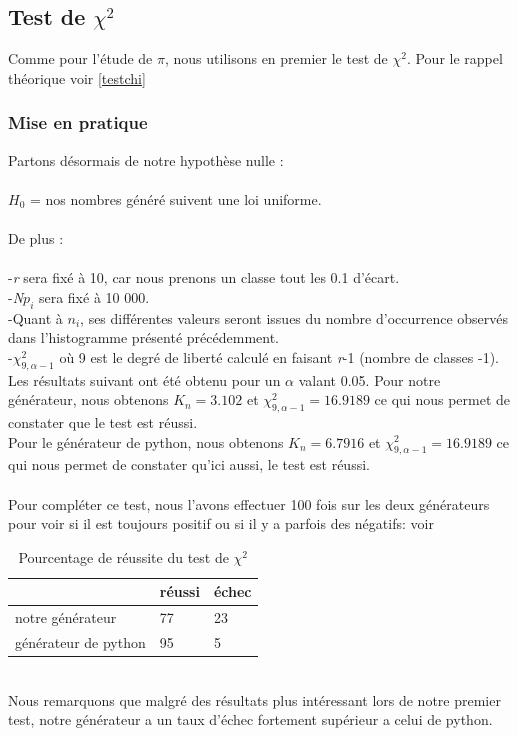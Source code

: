 \documentclass[french]{article}
\begin{document}
\subsection{Test de $\chi^{2}$}
Comme pour l'étude de $\pi$, nous utilisons en premier le test de $\chi^{2}$. Pour le rappel théorique voir \ref{testchi}
\subsubsection{Mise en pratique}
Partons désormais de notre hypothèse nulle :
\\
\\
       $H_{0}$ = {nos nombres généré suivent une loi uniforme}.
\\
\\
De plus : 
\\
\\
     -\textit{r} sera fixé à 10, car nous prenons un classe tout les 0.1 d'écart.
     \\
     -\textit{N$p_{i}$} sera fixé à 10 000.
     \\ 
     -Quant à \textit{$n_{i}$}, ses différentes valeurs seront issues du nombre d'occurrence observés dans l'histogramme présenté précédemment.
     \\
     -$\chi^{2}_{9,\alpha-1}$ où 9 est le degré de liberté calculé en faisant \textit{r}-1 (nombre de classes -1).
\\

Les résultats suivant ont été obtenu pour un $\alpha$ valant 0.05. Pour notre générateur, nous obtenons $K_n =3.102$ et $\chi^{2}_{9,\alpha-1} = 16.9189$ ce qui nous permet de constater que le test est réussi.\\
Pour le générateur de python, nous obtenons $K_n =6.7916$ et $\chi^{2}_{9,\alpha-1} = 16.9189$ ce qui nous permet de constater qu'ici aussi, le test est réussi.
\\\\
Pour compléter ce test, nous l'avons effectuer 100 fois sur les deux générateurs pour voir si il est toujours positif ou si il y a parfois des négatifs: voir 
\begin{table}[!h]
\centering
\caption{Pourcentage de réussite du test de $\chi^{2}$ }
\label{pourcentchi}
\begin{tabular}{l|l|l|}
\cline{2-3}
                                           & réussi & échec \\ \hline
\multicolumn{1}{|l|}{notre générateur}     & 77     & 23    \\ \hline
\multicolumn{1}{|l|}{générateur de python} & 95     & 5     \\ \hline
\end{tabular}
\end{table}
\\ Nous remarquons que malgré des résultats plus intéressant lors de notre premier test, notre générateur a un taux d'échec fortement supérieur a celui de python.
\end{document}
